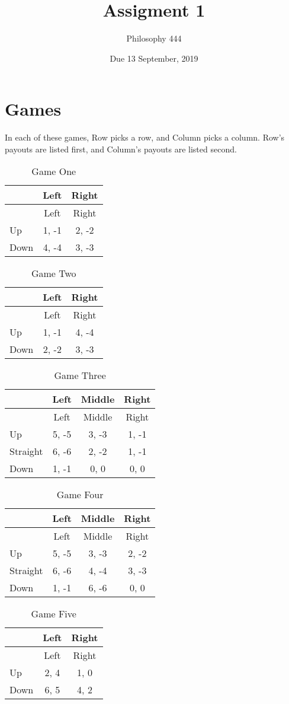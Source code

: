 \documentclass[
  11pt,
]{article}
\title{Assigment 1}
\author{Philosophy 444}
\date{Due 13 September, 2019}
\begin{document}
\maketitle

\captionsetup[table]{labelformat=empty}

\hypertarget{games}{%
\section{Games}\label{games}}

In each of these games, Row picks a row, and Column picks a column.
Row's payouts are listed first, and Column's payouts are listed second.

\begin{longtable}[]{@{}lcc@{}}
\caption{Game One}\tabularnewline
\toprule
& Left & Right\tabularnewline
\midrule
\endfirsthead
\toprule
& Left & Right\tabularnewline
\midrule
\endhead
Up & 1, -1 & 2, -2\tabularnewline
Down & 4, -4 & 3, -3\tabularnewline
\bottomrule
\end{longtable}

\begin{longtable}[]{@{}lcc@{}}
\caption{Game Two}\tabularnewline
\toprule
& Left & Right\tabularnewline
\midrule
\endfirsthead
\toprule
& Left & Right\tabularnewline
\midrule
\endhead
Up & 1, -1 & 4, -4\tabularnewline
Down & 2, -2 & 3, -3\tabularnewline
\bottomrule
\end{longtable}

\begin{longtable}[]{@{}lccc@{}}
\caption{Game Three}\tabularnewline
\toprule
& Left & Middle & Right\tabularnewline
\midrule
\endfirsthead
\toprule
& Left & Middle & Right\tabularnewline
\midrule
\endhead
Up & 5, -5 & 3, -3 & 1, -1\tabularnewline
Straight & 6, -6 & 2, -2 & 1, -1\tabularnewline
Down & 1, -1 & 0, 0 & 0, 0\tabularnewline
\bottomrule
\end{longtable}

\begin{longtable}[]{@{}lccc@{}}
\caption{Game Four}\tabularnewline
\toprule
& Left & Middle & Right\tabularnewline
\midrule
\endfirsthead
\toprule
& Left & Middle & Right\tabularnewline
\midrule
\endhead
Up & 5, -5 & 3, -3 & 2, -2\tabularnewline
Straight & 6, -6 & 4, -4 & 3, -3\tabularnewline
Down & 1, -1 & 6, -6 & 0, 0\tabularnewline
\bottomrule
\end{longtable}

\newpage

\begin{longtable}[]{@{}lcc@{}}
\caption{Game Five}\tabularnewline
\toprule
& Left & Right\tabularnewline
\midrule
\endfirsthead
\toprule
& Left & Right\tabularnewline
\midrule
\endhead
Up & 2, 4 & 1, 0\tabularnewline
Down & 6, 5 & 4, 2\tabularnewline
\bottomrule
\end{longtable}
\end{document}
